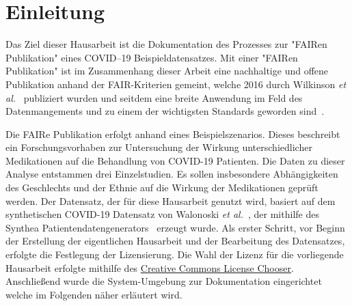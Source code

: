 \documentclass[12pt,a4paper,toc=bibliographynumbered,toc=indenttextentries]{scrreprt}
\begin{document}
	\chapter{Einleitung}
	Das Ziel dieser Hausarbeit ist die Dokumentation des Prozesses zur "FAIRen Publikation" eines COVID--19 Beispieldatensatzes. Mit einer "FAIRen Publikation" ist im Zusammenhang dieser Arbeit eine nachhaltige und offene Publikation anhand der FAIR-Kriterien gemeint, welche 2016 durch Wilkinson \textit{et al.}~\cite{10.1038/sdata.2016.18} publiziert wurden und seitdem eine breite Anwendung im Feld des Datenmangements und zu einem der wichtigsten Standards geworden sind~\cite{10.1016/j.cels.2019.09.011}. \par
	Die FAIRe Publikation erfolgt anhand eines Beispielszenarios. Dieses beschreibt ein Forschungsvorhaben zur Untersuchung der Wirkung unterschiedlicher Medikationen auf die Behandlung von COVID-19 Patienten. Die Daten zu dieser Analyse entstammen drei Einzelstudien. Es sollen insbesondere Abhängigkeiten des Geschlechts und der Ethnie auf die Wirkung der Medikationen geprüft werden. Der Datensatz, der für diese Hausarbeit genutzt wird, basiert auf dem synthetischen COVID-19 Datensatz von Walonoski \textit{et al.}~\cite{10.1016/j.ibmed.2020.100007}, der mithilfe des Synthea Patientendatengenerators~\cite{10.1093/jamia/ocx079} erzeugt wurde. 
	Als erster Schritt, vor Beginn der Erstellung der eigentlichen Hausarbeit und der Bearbeitung des Datensatzes, erfolgte die Festlegung der Lizensierung. Die Wahl der Lizenz für die vorliegende Hausarbeit erfolgte mithilfe des \href{https://creativecommons.org/choose/}{Creative Commons License Chooser}. Anschließend wurde die System-Umgebung zur Dokumentation eingerichtet welche im Folgenden näher erläutert wird.
				
\end{document}
